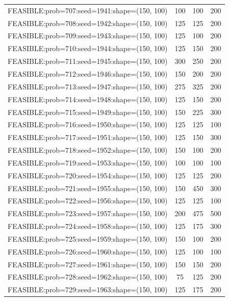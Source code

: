 \begin{longtable}{lccc}
FEASIBLE:prob=707:seed=1941:shape=(150, 100) &      100 &   100 &    200 \\
FEASIBLE:prob=708:seed=1942:shape=(150, 100) &      125 &   125 &    200 \\
FEASIBLE:prob=709:seed=1943:shape=(150, 100) &      125 &   100 &    200 \\
FEASIBLE:prob=710:seed=1944:shape=(150, 100) &      125 &   150 &    200 \\
FEASIBLE:prob=711:seed=1945:shape=(150, 100) &      300 &   250 &    200 \\
FEASIBLE:prob=712:seed=1946:shape=(150, 100) &      150 &   200 &    200 \\
FEASIBLE:prob=713:seed=1947:shape=(150, 100) &      275 &   325 &    200 \\
FEASIBLE:prob=714:seed=1948:shape=(150, 100) &      125 &   150 &    200 \\
FEASIBLE:prob=715:seed=1949:shape=(150, 100) &      150 &   225 &    300 \\
FEASIBLE:prob=716:seed=1950:shape=(150, 100) &      125 &   125 &    100 \\
FEASIBLE:prob=717:seed=1951:shape=(150, 100) &      125 &   150 &    300 \\
FEASIBLE:prob=718:seed=1952:shape=(150, 100) &      150 &   100 &    200 \\
FEASIBLE:prob=719:seed=1953:shape=(150, 100) &      100 &   100 &    100 \\
FEASIBLE:prob=720:seed=1954:shape=(150, 100) &      125 &   125 &    200 \\
FEASIBLE:prob=721:seed=1955:shape=(150, 100) &      150 &   450 &    300 \\
FEASIBLE:prob=722:seed=1956:shape=(150, 100) &      125 &   125 &    100 \\
FEASIBLE:prob=723:seed=1957:shape=(150, 100) &      200 &   475 &    500 \\
FEASIBLE:prob=724:seed=1958:shape=(150, 100) &      125 &   175 &    300 \\
FEASIBLE:prob=725:seed=1959:shape=(150, 100) &      150 &   100 &    200 \\
FEASIBLE:prob=726:seed=1960:shape=(150, 100) &      125 &   100 &    100 \\
FEASIBLE:prob=727:seed=1961:shape=(150, 100) &      150 &   150 &    200 \\
FEASIBLE:prob=728:seed=1962:shape=(150, 100) &       75 &   125 &    200 \\
FEASIBLE:prob=729:seed=1963:shape=(150, 100) &      125 &   175 &    200 \\

\end{longtable}
